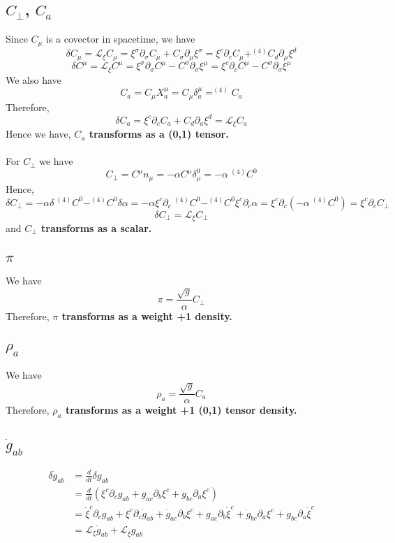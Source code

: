 \documentclass{article}
\begin{document}
\subsection{$C_{\perp}$, $C_{a}$}
Since $C_{\mu}$ is a covector in spacetime, we have
\[
\delta C_{\mu} = \mathcal{L}_{\xi}C_{\mu} = \xi^{\sigma}\partial_{\sigma}C_{\mu} + C_{\sigma}\partial_{\mu}\xi^{\sigma} = \xi^{c}\partial_{c}C_{\mu} + ^{(4)}C_{d}\partial_{\mu}\xi^{d}
\]
\[
\delta C^{\mu} = \mathcal{L}_{\xi}C^{\mu} = \xi^{\sigma}\partial_{\sigma}C^{\mu} - C^{\sigma}\partial_{\sigma}\xi^{\mu} = \xi^{c}\partial_{c}C^{\mu} - C^{\sigma}\partial_{\sigma}\xi^{\mu}
\]
We also have
\[
C_{a} = C_{\mu}X^{\mu}_{a} = C_{\mu}\delta^{\mu}_{a} = ^{(4)}C_{a}
\]
Therefore, 
\[
\boxed{
\delta C_{a} = \xi^{c}\partial_{c}C_{a} + C_{d}\partial_{a}\xi^{d} = \mathcal{L}_{\xi}C_{a}
}
\]
Hence we have, {\bf {\color{red}$C_{a}$ transforms as a (0,1) tensor.}}\\
\\
For $C_{\perp}$ we have
\[
C_{\perp} = C^{\mu}n_{\mu} = -\alpha C^{\mu}\delta_{\mu}^{0} = -\alpha ~^{(4)}C^{0}
\]
Hence, 
\[
\delta C_{\perp} = -\alpha \delta ~^{(4)}C^{0}  - ^{(4)}C^{0}\delta\alpha = -\alpha \xi^{c}\partial_{c}~^{(4)}C^{0} - ^{(4)}C^{0}\xi^{c}\partial_{c}\alpha = \xi^{c}\partial_{c}(-\alpha~^{(4)}C^{0}) = \xi^{c}\partial_{c}C_{\perp}
\]
\[
\boxed{
\delta C_{\perp} = \mathcal{L}_{\xi}C_{\perp}
}
\]
and {\bf {\color{red}$C_{\perp}$ transforms as a scalar.}}
\subsection{$\pi$}
We have
\[
\pi = \frac{\sqrt{g}}{\alpha}C_{\perp}
\]
Therefore, {\bf {\color{red}$\pi$ transforms as a weight +1 density.}}
\subsection{$\rho_{a}$}
We have
\[
\rho_{a} = \frac{\sqrt{g}}{\alpha}C_{a}
\]
Therefore, {\bf {\color{red}$\rho_{a}$ transforms as a weight +1 (0,1) tensor density.}}
\subsection{${\dot g}_{ab}$}
\begin{align*}
\delta {\dot g}_{ab} & = \frac{d}{dt}\delta g_{ab}\\
& = \frac{d}{dt}(\xi^{c}\partial_{c}g_{ab} + g_{ac}\partial_{b}\xi^{c} + g_{bc}\partial_{a}\xi^{c})\\
& = {\dot \xi}^{c}\partial_{c}g_{ab} + \xi^{c}\partial_{c}{\dot g}_{ab} + {\dot g}_{ac}\partial_{b}\xi^{c} + g_{ac}\partial_{b}{\dot \xi}^{c} + {\dot g}_{bc}\partial_{a}\xi^{c} + g_{bc}\partial_{a}{\dot \xi}^{c}\\
& = \mathcal{L}_{\xi}{\dot g}_{ab} + \mathcal{L}_{{\dot \xi}}g_{ab}
\end{align*}
\end{document}
